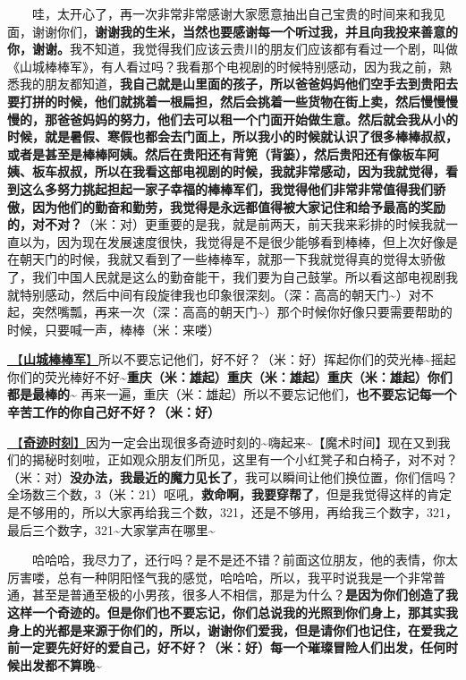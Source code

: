 \documentclass[]{ctexbook}
\begin{document}
  哇，太开心了，再一次非常非常感谢大家愿意抽出自己宝贵的时间来和我见面，谢谢你们，\textbf{谢谢我的生米，当然也要感谢每一个听过我，并且向我投来善意的你，谢谢。}我不知道，我觉得我们应该云贵川的朋友们应该都有看过一个剧，叫做《山城棒棒军》，有人看过吗？我看那个电视剧的时候特别感动，因为我之前，熟悉我的朋友都知道，\textbf{我自己就是山里面的孩子，所以爸爸妈妈他们空手去到贵阳去要打拼的时候，他们就挑着一根扁担，然后会挑着一些货物在街上卖，然后慢慢慢慢的，那爸爸妈妈的努力，他们去可以租一个门面开始做生意。然后就会我从小的时候，就是暑假、寒假也都会去门面上，所以我小的时候就认识了很多棒棒叔叔，或者是甚至是棒棒阿姨。然后在贵阳还有背篼（背篓），然后贵阳还有像板车阿姨、板车叔叔，所以在我看这部电视剧的时候，我就非常感动，因为我就觉得，看到这么多努力挑起担起一家子幸福的棒棒军们，我觉得他们非常非常值得我们骄傲，因为他们的勤奋和勤劳，我觉得是永远都值得被大家记住和给予最高的奖励的，对不对？}（米：对）更重要的是我，就是前两天，前天我来彩排的时候我就一直以为，因为现在发展速度很快，我觉得是不是很少能够看到棒棒，但上次好像是在朝天门的时候，我就又看到了一些棒棒军，就那一下我就觉得真的觉得太骄傲了，我们中国人民就是这么的勤奋能干，我们要为自己鼓掌。所以看这部电视剧我就特别感动，然后中间有段旋律我也印象很深刻。（深：高高的朝天门\textasciitilde）对不起，突然嘴瓢，再来一次（深：高高的朝天门\textasciitilde）那个时候你好像只要需要帮助的时候，只要喊一声，棒棒（米：来喽）

\hyperref[nice-chongqing]{🎵【\textbf{山城棒棒军}】}所以不要忘记他们，好不好？（米：好）挥起你们的荧光棒\textasciitilde 摇起你们的荧光棒好不好\textasciitilde{}\textbf{重庆（米：雄起）重庆（米：雄起）重庆（米：雄起）你们都是最棒的\textasciitilde{}} 再来一遍，重庆（米：雄起）所以不要忘记他们，\textbf{也不要忘记每一个辛苦工作的你自己好不好？（米：好）}

\hyperref[magic-moment]{🎵【\textbf{奇迹时刻}】}因为一定会出现很多奇迹时刻的\textasciitilde 嗨起来\textasciitilde【魔术时间】现在又到我们的揭秘时刻啦，正如观众朋友们所见，这里有一个小红凳子和白椅子，对不对？（米：对）\textbf{没办法，我最近的魔力见长了}，我可以瞬间让他们换位置，你们信吗？全场数三个数，3（米：21）呕吼，\textbf{救命啊，我要穿帮了}，但是我觉得这样的肯定是不够用的，所以大家再给我三个数，321，还是不够用，再给我三个数字，321，最后三个数字，321\textasciitilde 大家掌声在哪里\textasciitilde{}

  哈哈哈，我尽力了，还行吗？是不是还不错？前面这位朋友，他的表情，你太厉害喽，总有一种阴阳怪气我的感觉，哈哈哈，所以，我平时说我是一个非常普通，甚至是普通至极的小男孩，很多人不相信，那是为什么？\textbf{是因为你们创造了我这样一个奇迹的。但是你们也不要忘记，你们总说我的光照到你们身上，那其实我身上的光都是来源于你们的，所以，谢谢你们爱我，但是请你们也记住，在爱我之前一定要先好好的爱自己，好不好？（米：好）每一个璀璨冒险人们出发，任何时候出发都不算晚\textasciitilde{}}
\end{document}
